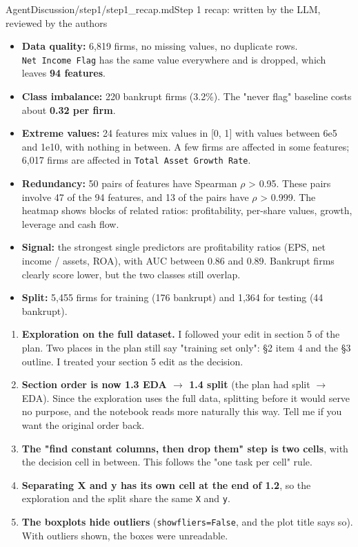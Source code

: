 \begin{mdfile}{AgentDiscussion/\allowbreak{}step1/\allowbreak{}step1\_recap.md}{Step 1 recap: written by the LLM, reviewed by the authors}
\begin{itemize}
\tightlist
\item
  \textbf{Data quality:} 6,819 firms, no missing values, no duplicate rows. \texttt{Net\ Income\ Flag} has the same value everywhere and is dropped, which leaves \textbf{94 features}.
\item
  \textbf{Class imbalance:} 220 bankrupt firms (3.2\%). The "never flag" baseline costs about \textbf{0.32 per firm}.
\item
  \textbf{Extreme values:} 24 features mix values in {[}0, 1{]} with values between 6e5 and 1e10, with nothing in between. A few firms are affected in some features; 6,017 firms are affected in \texttt{Total\ Asset\ Growth\ Rate}.
\item
  \textbf{Redundancy:} 50 pairs of features have Spearman \textbar \ensuremath{\rho}\textbar{} \textgreater{} 0.95. These pairs involve 47 of the 94 features, and 13 of the pairs have \textbar \ensuremath{\rho}\textbar{} \textgreater{} 0.999. The heatmap shows blocks of related ratios: profitability, per-share values, growth, leverage and cash flow.
\item
  \textbf{Signal:} the strongest single predictors are profitability ratios (EPS, net income / assets, ROA), with AUC between 0.86 and 0.89. Bankrupt firms clearly score lower, but the two classes still overlap.
\item
  \textbf{Split:} 5,455 firms for training (176 bankrupt) and 1,364 for testing (44 bankrupt).
\end{itemize}


\begin{enumerate}
\def\labelenumi{\arabic{enumi}.}
\tightlist
\item
  \textbf{Exploration on the full dataset.} I followed your edit in section 5 of the plan. Two places in the plan still say "training set only": §2 item 4 and the §3 outline. I treated your section 5 edit as the decision.
\item
  \textbf{Section order is now 1.3 EDA \ensuremath{\rightarrow} 1.4 split} (the plan had split \ensuremath{\rightarrow} EDA). Since the exploration uses the full data, splitting before it would serve no purpose, and the notebook reads more naturally this way. Tell me if you want the original order back.
\item
  \textbf{The "find constant columns, then drop them" step is two cells}, with the decision cell in between. This follows the "one task per cell" rule.
\item
  \textbf{Separating X and y has its own cell at the end of 1.2}, so the exploration and the split share the same \texttt{X} and \texttt{y}.
\item
  \textbf{The boxplots hide outliers} (\texttt{showfliers=False}, and the plot title says so). With outliers shown, the boxes were unreadable.
\end{enumerate}


\end{mdfile}
